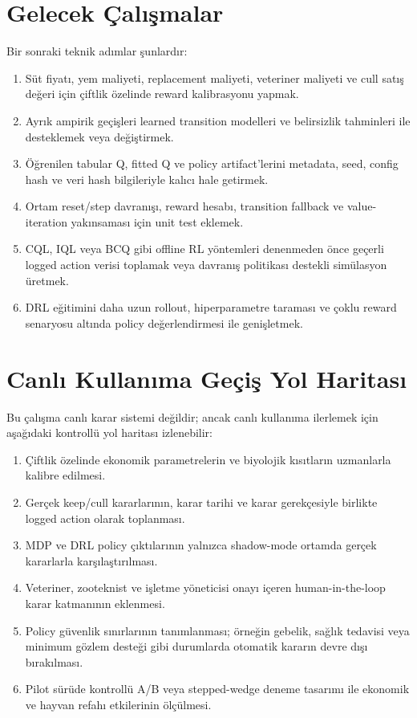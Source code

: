 \documentclass[conference]{IEEEtran}
\begin{document}
\section{Gelecek Çalışmalar}
Bir sonraki teknik adımlar şunlardır:
\begin{enumerate}
    \item Süt fiyatı, yem maliyeti, replacement maliyeti, veteriner maliyeti ve
    cull satış değeri için çiftlik özelinde reward kalibrasyonu yapmak.
    \item Ayrık ampirik geçişleri learned transition modelleri ve belirsizlik
    tahminleri ile desteklemek veya değiştirmek.
    \item Öğrenilen tabular Q, fitted Q ve policy artifact'lerini metadata,
    seed, config hash ve veri hash bilgileriyle kalıcı hale getirmek.
    \item Ortam reset/step davranışı, reward hesabı, transition fallback ve
    value-iteration yakınsaması için unit test eklemek.
    \item CQL, IQL veya BCQ gibi offline RL yöntemleri denenmeden önce geçerli
    logged action verisi toplamak veya davranış politikası destekli simülasyon
    üretmek.
    \item DRL eğitimini daha uzun rollout, hiperparametre taraması ve çoklu
    reward senaryosu altında policy değerlendirmesi ile genişletmek.
\end{enumerate}

\section{Canlı Kullanıma Geçiş Yol Haritası}
Bu çalışma canlı karar sistemi değildir; ancak canlı kullanıma ilerlemek için
aşağıdaki kontrollü yol haritası izlenebilir:
\begin{enumerate}
    \item Çiftlik özelinde ekonomik parametrelerin ve biyolojik kısıtların
    uzmanlarla kalibre edilmesi.
    \item Gerçek keep/cull kararlarının, karar tarihi ve karar gerekçesiyle
    birlikte logged action olarak toplanması.
    \item MDP ve DRL policy çıktılarının yalnızca shadow-mode ortamda gerçek
    kararlarla karşılaştırılması.
    \item Veteriner, zooteknist ve işletme yöneticisi onayı içeren human-in-the-loop
    karar katmanının eklenmesi.
    \item Policy güvenlik sınırlarının tanımlanması; örneğin gebelik, sağlık
    tedavisi veya minimum gözlem desteği gibi durumlarda otomatik kararın
    devre dışı bırakılması.
    \item Pilot sürüde kontrollü A/B veya stepped-wedge deneme tasarımı ile
    ekonomik ve hayvan refahı etkilerinin ölçülmesi.
\end{enumerate}
\end{document}
